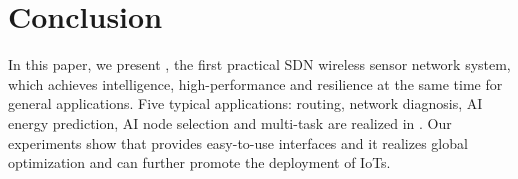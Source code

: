 \section{Conclusion}
\label{Con}

In this paper, we present {\sdn}, the first practical SDN 
wireless sensor network system,
which achieves intelligence, high-performance and 
resilience at the same time for general applications. 
Five typical applications: routing, network diagnosis, AI energy prediction, 
AI node selection and multi-task are realized in {\sdn}.
%
Our experiments show that {\sdn} 
%
{\sdn} provides easy-to-use interfaces 
and it realizes global optimization and 
can further promote the deployment of IoTs.

